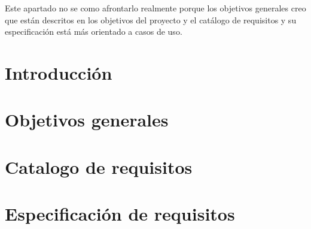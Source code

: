
Este apartado no se como afrontarlo realmente porque los objetivos generales creo que están descritos en los objetivos del proyecto y el catálogo de requisitos y su especificación está más orientado a casos de uso.
\section{Introducción}

\section{Objetivos generales}

\section{Catalogo de requisitos}

\section{Especificación de requisitos}



